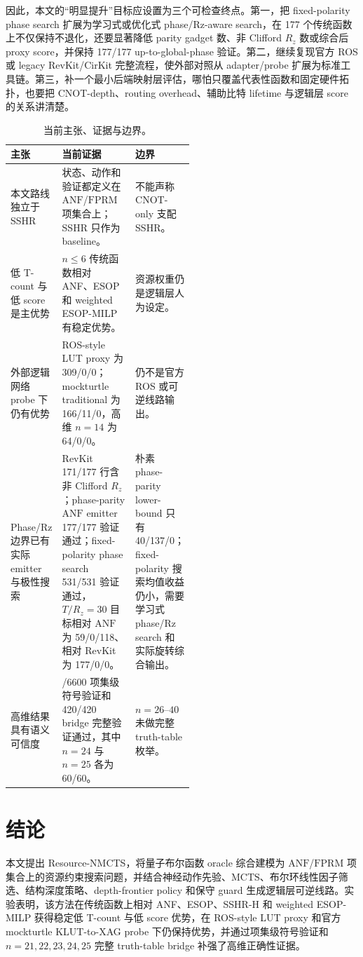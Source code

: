 \documentclass[UTF8,fontset=macnew,11pt]{ctexart}
\newcommand{\method}{Resource-NMCTS}
\newcommand{\anf}{\ensuremath{\mathrm{ANF}}}
\newcommand{\fprm}{\ensuremath{\mathrm{FPRM}}}
\newcommand{\mcts}{\ensuremath{\mathrm{MCTS}}}
\newcommand{\rz}{\ensuremath{R_z}}
\newcommand{\ttable}{truth-table}
\begin{document}
因此，本文的“明显提升”目标应设置为三个可检查终点。第一，把 fixed-polarity phase search 扩展为学习式或优化式 phase/Rz-aware search，在 177 个传统函数上不仅保持不退化，还要显著降低 parity gadget 数、非 Clifford \rz{} 数或综合后 proxy score，并保持 177/177 up-to-global-phase 验证。第二，继续复现官方 ROS 或 legacy RevKit/CirKit 完整流程，使外部对照从 adapter/probe 扩展为标准工具链。第三，补一个最小后端映射层评估，哪怕只覆盖代表性函数和固定硬件拓扑，也要把 CNOT-depth、routing overhead、辅助比特 lifetime 与逻辑层 score 的关系讲清楚。

\begin{table}[H]
\centering
\small
\caption{当前主张、证据与边界。}
\label{tab:evidence-map}
\begin{tabularx}{\linewidth}{>{\raggedright\arraybackslash}p{0.27\linewidth}>{\raggedright\arraybackslash}X>{\raggedright\arraybackslash}p{0.25\linewidth}}
\toprule
主张 & 当前证据 & 边界 \\
\midrule
本文路线独立于 SSHR & 状态、动作和验证都定义在 \anf{}/\fprm{} 项集合上；SSHR 只作为 baseline。 & 不能声称 CNOT-only 支配 SSHR。 \\
低 T-count 与低 score 是主优势 & $n\leq6$ 传统函数相对 ANF、ESOP 和 weighted ESOP-MILP 有稳定优势。 & 资源权重仍是逻辑层人为设定。 \\
外部逻辑网络 probe 下仍有优势 & ROS-style LUT proxy 为 309/0/0；mockturtle traditional 为 166/11/0，高维 $n=14$ 为 64/0/0。 & 仍不是官方 ROS 或可逆线路输出。 \\
Phase/Rz 边界已有实际 emitter 与极性搜索 & RevKit 171/177 行含非 Clifford \rz{}；phase-parity \anf{} emitter 177/177 验证通过；fixed-polarity phase search 531/531 验证通过，$T/R_z=30$ 目标相对 \anf{} 为 59/0/118、相对 RevKit 为 177/0/0。 & 朴素 phase-parity lower-bound 只有 40/137/0；fixed-polarity 搜索均值收益仍小，需要学习式 phase/Rz search 和实际旋转综合输出。 \\
高维结果具有语义可信度 & 6600/6600 项集级符号验证和 420/420 bridge 完整验证通过，其中 $n=24$ 与 $n=25$ 各为 60/60。 & $n=26$--$40$ 未做完整 \ttable{} 枚举。 \\
\bottomrule
\end{tabularx}
\end{table}

\section{结论}

本文提出 \method{}，将量子布尔函数 oracle 综合建模为 \anf{}/\fprm{} 项集合上的资源约束搜索问题，并结合神经动作先验、\mcts{}、布尔环线性因子筛选、结构深度策略、depth-frontier policy 和保守 guard 生成逻辑层可逆线路。实验表明，该方法在传统函数上相对 ANF、ESOP、SSHR-H 和 weighted ESOP-MILP 获得稳定低 T-count 与低 score 优势，在 ROS-style LUT proxy 和官方 mockturtle KLUT-to-XAG probe 下仍保持优势，并通过项集级符号验证和 $n=21,22,23,24,25$ 完整 truth-table bridge 补强了高维正确性证据。
\end{document}
